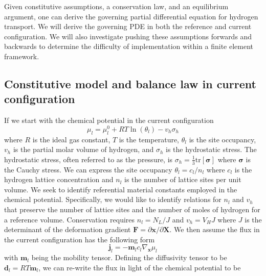 \documentclass[10pt]{elsarticle}
\newcommand{\mbs}[1]{\boldsymbol{#1}}
\def\bs{{\mbs{s}}} \def\bt{{\mbs{t}}} \def\bu{{\mbs{u}}}
\def\bs{\boldsymbol}
\begin{document}
Given constitutive assumptions, a conservation law, and an equilibrium argument, one can derive the governing partial differential equation for hydrogen transport. We will derive the governing PDE in both the reference and current configuration. We will also investigate pushing these assumptions forwards and backwards to determine the difficulty of implementation within a finite element framework.

\subsection{Constitutive model and balance law in current configuration} If we start with the chemical potential in the current configuration
\begin{equation}
\label{eq.chemical.potential}{\mu_{l} = \mu_{l}^{0} + R T \ln(\theta_{l}) - v_{h} \sigma_{h}}
\end{equation}
where $R$ is the ideal gas constant, $T$ is the temperature, $\theta_{l}$ is the site occupancy, $v_{h}$ is the partial molar volume of hydrogen, and $\sigma_{h}$ is the hydrostatic stress. The hydrostatic stress, often referred to as the pressure, is $\sigma_{h} = \frac {1} {3} \text{tr}[\bs{\sigma}]$ where $\bs{\sigma}$ is the Cauchy stress. We can express the site occupancy $\theta_{l} = c_{l}/n_{l}$ where $c_{l}$ is the hydrogen lattice concentration and $n_{l}$ is the number of lattice sites per unit volume. We seek to identify referential material constants employed in the chemical potential. Specifically, we would like to identify relations for $n_{l}$ and $v_{h}$ that preserve the number of lattice sites and the number of moles of hydrogen for a reference volume. Conservation requires $n_{l} = N_{L}/J$ and $v_{h} = V_{H}J$ where $J$ is the determinant of the deformation gradient $\bs{F} = \partial \bs{x} / \partial \bs{X}$. We then assume the flux in the current configuration has the following form
%
\begin{equation}
\label{eq.flux}{\bs{j}_{l} = -\bs{m}_{l} c_{l} \nabla_{\bs{x}}\mu_{l}}
\end{equation}
%
with $\bs{m}_{l}$ being the mobility tensor. Defining the diffusivity tensor to be $\bs{d}_{l} = R T \bs{m}_{l} $, we can re-write the flux in light of the chemical potential to be 
\end{document}
